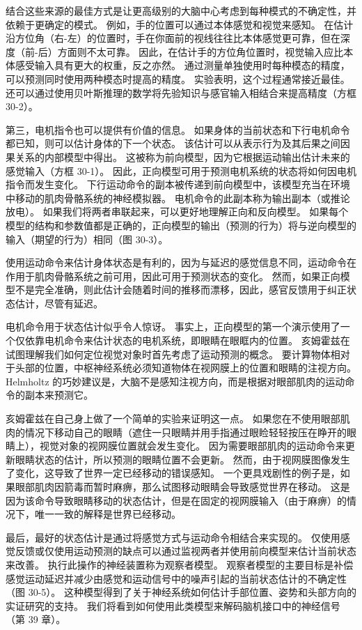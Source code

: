 结合这些来源的最佳方式是让更高级别的大脑中心考虑到每种模式的不确定性，并依赖于更确定的模式。 例如，手的位置可以通过本体感觉和视觉来感知。 在估计沿方位角（右-左）的位置时，手在你面前的视线往往比本体感觉更可靠，但在深度（前-后）方面则不太可靠。 因此，在估计手的方位角位置时，视觉输入应比本体感受输入具有更大的权重，反之亦然。 通过测量单独使用时每种模态的精度，可以预测同时使用两种模态时提高的精度。 实验表明，这个过程通常接近最佳。 还可以通过使用贝叶斯推理的数学将先验知识与感官输入相结合来提高精度（方框 30-2）。

第三，电机指令也可以提供有价值的信息。 如果身体的当前状态和下行电机命令都已知，则可以估计身体的下一个状态。 该估计可以从表示行为及其后果之间因果关系的内部模型中得出。 这被称为前向模型，因为它根据运动输出估计未来的感觉输入（方框 30-1）。 因此，正向模型可用于预测电机系统的状态将如何因电机指令而发生变化。 下行运动命令的副本被传递到前向模型中，该模型充当在环境中移动的肌肉骨骼系统的神经模拟器。 电机命令的此副本称为输出副本（或推论放电）。 如果我们将两者串联起来，可以更好地理解正向和反向模型。 如果每个模型的结构和参数值都是正确的，正向模型的输出（预测的行为）将与逆向模型的输入（期望的行为）相同（图 30-3）。

使用运动命令来估计身体状态是有利的，因为与延迟的感觉信息不同，运动命令在作用于肌肉骨骼系统之前可用，因此可用于预测状态的变化。 然而，如果正向模型不是完全准确，则此估计会随着时间的推移而漂移，因此，感官反馈用于纠正状态估计，尽管有延迟。

电机命令用于状态估计似乎令人惊讶。 事实上，正向模型的第一个演示使用了一个仅依靠电机命令来估计状态的电机系统，即眼睛在眼眶内的位置。 亥姆霍兹在试图理解我们如何定位视觉对象时首先考虑了运动预测的概念。 要计算物体相对于头部的位置，中枢神经系统必须知道物体在视网膜上的位置和眼睛的注视方向。 Helmholtz 的巧妙建议是，大脑不是感知注视方向，而是根据对眼部肌肉的运动命令的副本来预测它。

亥姆霍兹在自己身上做了一个简单的实验来证明这一点。 如果您在不使用眼部肌肉的情况下移动自己的眼睛（遮住一只眼睛并用手指通过眼睑轻轻按压在睁开的眼睛上），视觉对象的视网膜位置就会发生变化。 因为需要眼部肌肉的运动命令来更新眼睛状态的估计，所以预测的眼睛位置不会更新。 然而，由于视网膜图像发生了变化，这导致了世界一定已经移动的错误感知。 一个更具戏剧性的例子是，如果眼部肌肉因箭毒而暂时麻痹，那么试图移动眼睛会导致感觉世界在移动。 这是因为该命令导致眼睛移动的状态估计，但是在固定的视网膜输入（由于麻痹）的情况下，唯一一致的解释是世界已经移动。

最后，最好的状态估计是通过将感觉方式与运动命令相结合来实现的。 仅使用感觉反馈或仅使用运动预测的缺点可以通过监视两者并使用前向模型来估计当前状态来改善。 执行此操作的神经装置称为观察者模型。 观察者模型的主要目标是补偿感觉运动延迟并减少由感觉和运动信号中的噪声引起的当前状态估计的不确定性（图 30-5）。 这种模型得到了关于神经系统如何估计手部位置、姿势和头部方向的实证研究的支持。 我们将看到如何使用此类模型来解码脑机接口中的神经信号（第 39 章）。

